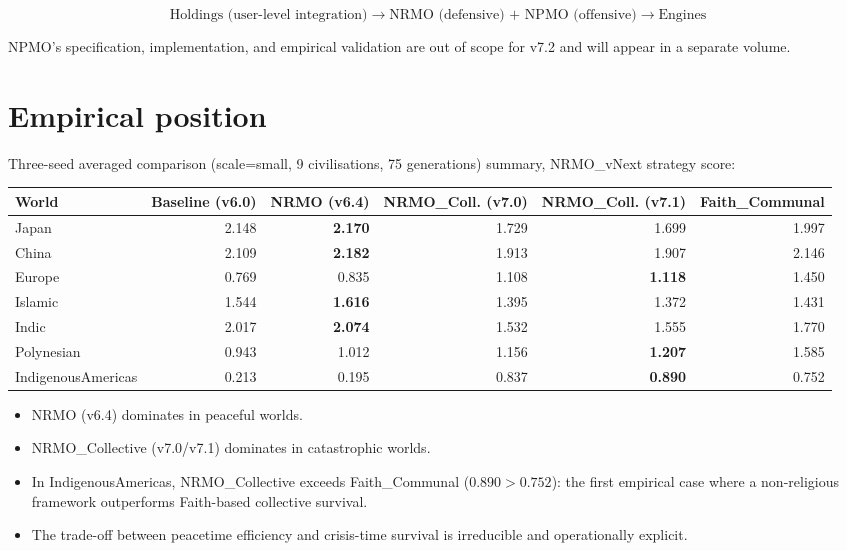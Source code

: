 \[
\boxed{\text{Holdings (user-level integration)} \to
       \text{NRMO (defensive) + NPMO (offensive)} \to \text{Engines}}
\]

NPMO's specification, implementation, and empirical validation are
out of scope for v7.2 and will appear in a separate volume.

\section*{Empirical position}

Three-seed averaged comparison (scale=small, 9 civilisations,
75 generations) summary, NRMO\_vNext strategy score:

\begin{center}
\footnotesize
\begin{tabular}{lrrrrr}
\toprule
World & Baseline (v6.0) & NRMO (v6.4) & NRMO\_Coll. (v7.0) & NRMO\_Coll. (v7.1) & Faith\_Communal \\
\midrule
Japan              & 2.148 & \textbf{2.170} & 1.729 & 1.699 & 1.997 \\
China              & 2.109 & \textbf{2.182} & 1.913 & 1.907 & 2.146 \\
Europe             & 0.769 & 0.835 & 1.108 & \textbf{1.118} & 1.450 \\
Islamic            & 1.544 & \textbf{1.616} & 1.395 & 1.372 & 1.431 \\
Indic              & 2.017 & \textbf{2.074} & 1.532 & 1.555 & 1.770 \\
Polynesian         & 0.943 & 1.012 & 1.156 & \textbf{1.207} & 1.585 \\
IndigenousAmericas & 0.213 & 0.195 & 0.837 & \textbf{0.890} & 0.752 \\
\bottomrule
\end{tabular}
\end{center}

\begin{itemize}
\item NRMO (v6.4) dominates in peaceful worlds.
\item NRMO\_Collective (v7.0/v7.1) dominates in catastrophic worlds.
\item In IndigenousAmericas, NRMO\_Collective exceeds Faith\_Communal
  ($0.890 > 0.752$): the first empirical case where a non-religious
  framework outperforms Faith-based collective survival.
\item The trade-off between peacetime efficiency and crisis-time
  survival is irreducible and operationally explicit.
\end{itemize}

